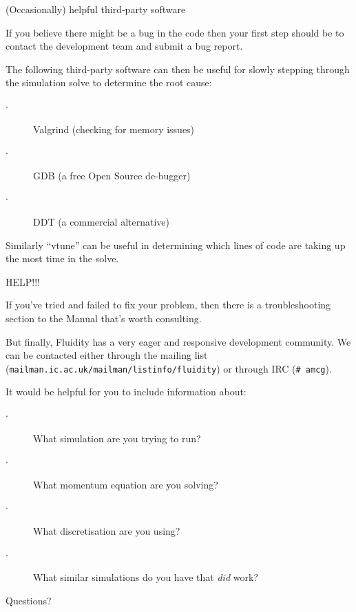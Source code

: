 \documentclass[t]{beamer}
\begin{document}

\begin{frame}{(Occasionally) helpful third-party software}

If you believe there might be a bug in the code
then your first step should be to contact the development team and submit a bug report.

\vspace{1ex}
The following third-party software can then be useful for slowly stepping through the simulation solve to determine the root cause:
\vspace{1ex}

\begin{description}
 \item[$\cdot$] Valgrind (checking for memory issues)
 \item[$\cdot$] GDB (a free Open Source de-bugger)
 \item[$\cdot$] DDT (a commercial alternative) 
\end{description}

Similarly ``vtune'' can be useful in determining which lines of code are taking up the most time in the solve.

\end{frame}


\begin{frame}{HELP!!!}

If you've tried and failed to fix your problem, then there is a troubleshooting section to the Manual that's worth consulting.

\vspace{1ex}
But finally, Fluidity has a very eager and responsive development community.  
We can be contacted either through the mailing list ({\tt mailman.ic.ac.uk/mailman/listinfo/fluidity})
or through IRC ({\tt \# amcg}).

\vspace{1ex}
It would be helpful for you to include information about:
\begin{description}
 \item[$\cdot$] What simulation are you trying to run?
 \item[$\cdot$] What momentum equation are you solving?
 \item[$\cdot$] What discretisation are you using?
 \item[$\cdot$] What similar simulations do you have that {\it did} work?
 
\end{description}
\end{frame}

\begin{frame}
\begin{center}
{\Huge Questions?}
\end{center}
\end{frame}
\end{document}
